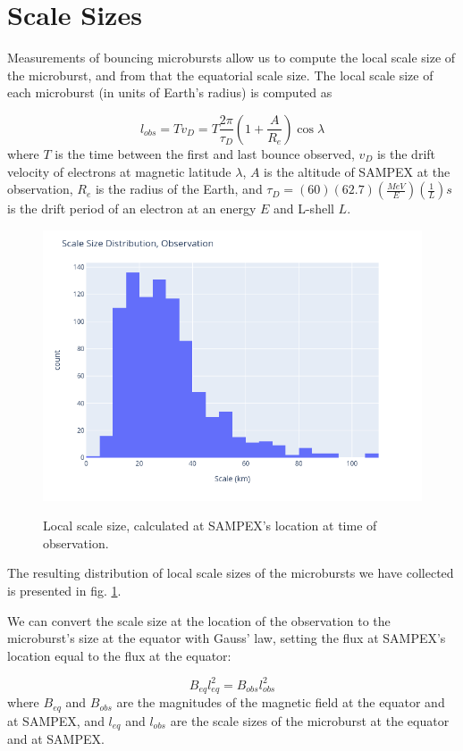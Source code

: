 \documentclass[draft]{agujournal2019}
\begin{document}
\section{Scale Sizes}
Measurements of bouncing microbursts allow us to compute the local scale size of the microburst, and from that the equatorial scale size. 
The local scale size of each microburst (in units of Earth's radius) is computed as

\begin{equation}
 l_{obs} = T v_D  = T \frac{2 \pi}{\tau_D} (1+ \frac{A}{R_e}) \cos \lambda 
\end{equation}
where $T$ is the time between the first and last bounce observed, $v_D$ is the drift velocity of electrons at magnetic latitude $\lambda$, $A$ is the altitude of SAMPEX at the observation, $R_e$ is the radius of the Earth, and $\tau_D= (60)(62.7)(\frac{MeV}{E})(\frac{1}{L})s$ is the drift period of an electron at an energy $E$ and L-shell $L$. 
\begin{figure}[h!]
 \includegraphics[width=\textwidth]{scale_hist_local.png}
 \label{fig:local}
 \caption{Local scale size, calculated at SAMPEX's location at time of observation.}
\end{figure}
The resulting distribution of local scale sizes of the microbursts we have collected is presented in fig. \ref{fig:local}.

We can convert the scale size at the location of the observation to the microburst's size at the equator with Gauss' law, setting the flux at SAMPEX's location equal to the flux at the equator:

\begin{equation}
 B_{eq} l_{eq}^2 = B_{obs} l_{obs}^2
\end{equation}
where $B_{eq}$ and $B_{obs}$ are the magnitudes of the magnetic field at the equator and at SAMPEX, and $l_{eq}$ and $l_{obs}$ are the scale sizes of the microburst at the equator and at SAMPEX.
\end{document}
